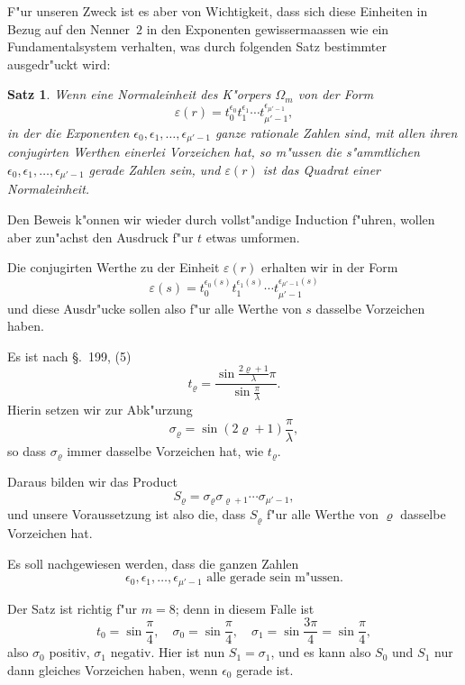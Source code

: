 \documentclass[10pt,a4paper]{article}
\theoremstyle{weberstyle}
\newtheorem{satz}{Satz}[section]
\begin{document}
F"ur unseren Zweck ist es aber von Wichtigkeit, dass sich diese Einheiten
in Bezug auf den Nenner~$2$ in den Exponenten gewissermaassen wie ein
Fundamentalsystem verhalten, was durch folgenden Satz bestimmter
ausgedr"uckt wird:

\begin{satz}
Wenn eine Normaleinheit des K"orpers $\Omega_m$ von der Form
\[
\varepsilon(r) = t_0^{\epsilon_0} t_1^{\epsilon_1}
\cdots t_{\mu'-1}^{\epsilon_{\mu'-1}},
\]
in der die Exponenten $\epsilon_0,\epsilon_1,\dots,\epsilon_{\mu'-1}$ ganze rationale
Zahlen sind, mit allen ihren conjugirten Werthen einerlei Vorzeichen hat,
so m"ussen die s"ammtlichen $\epsilon_0,\epsilon_1,\dots,\epsilon_{\mu'-1}$ gerade Zahlen
sein, und $\varepsilon(r)$ ist das Quadrat einer Normaleinheit.
\end{satz}

Den Beweis k"onnen wir wieder durch vollst"andige Induction f"uhren, wollen
aber zun"achst den Ausdruck f"ur $t$ etwas umformen.

Die conjugirten Werthe zu der Einheit $\varepsilon(r)$ erhalten wir in der Form
\[
\varepsilon(s) = t_0^{\epsilon_0(s)} t_1^{\epsilon_1(s)}
\cdots t_{\mu'-1}^{\epsilon_{\mu'-1}(s)}
\]
und diese Ausdr"ucke sollen also f"ur alle Werthe von $s$ dasselbe
Vorzeichen haben.

Es ist nach \S.~199, (5)
\[
t_\varrho = \frac{\sin\frac{2\varrho+1}{\lambda}\pi}{\sin\frac{\pi}{\lambda}}.
\]
Hierin setzen wir zur Abk"urzung
\begin{equation}\label{eq:200.12}
\sigma_\varrho = \sin(2\varrho+1)\frac{\pi}{\lambda},
\end{equation}
so dass $\sigma_\varrho$ immer dasselbe Vorzeichen hat, wie $t_\varrho$.

Daraus bilden wir das Product
\begin{equation}\label{eq:200.13}
S_\varrho = \sigma_\varrho\sigma_{\varrho+1}\cdots\sigma_{\mu'-1},
\end{equation}
und unsere Voraussetzung ist also die, dass $S_\varrho$ f"ur alle Werthe von
$\varrho$ dasselbe Vorzeichen hat.

Es soll nachgewiesen werden, dass die ganzen Zahlen
\[
\epsilon_0,\epsilon_1,\dots,\epsilon_{\mu'-1}\text{ alle gerade sein m"ussen.}
\]

Der Satz ist richtig f"ur $m=8$; denn in diesem Falle ist
\[
t_0=\sin\frac{\pi}{4},\quad \sigma_0=\sin\frac{\pi}{4},\quad
\sigma_1=\sin\frac{3\pi}{4}=\sin\frac{\pi}{4},
\]
also $\sigma_0$ positiv, $\sigma_1$ negativ. Hier ist nun $S_1=\sigma_1$, und es
kann also $S_0$ und $S_1$ nur dann gleiches Vorzeichen haben, wenn
$\epsilon_0$ gerade ist.
\end{document}

